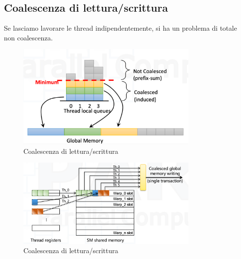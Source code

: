 \subsection{Coalescenza di lettura/scrittura}
Se lasciamo lavorare le thread indipendentemente, si ha un problema
di totale non coalescenza. 
\begin{figure}[H]
  \centering
  \includegraphics[width=0.8\textwidth]{img/coalescenza_bfs.png}
  \caption{Coalescenza di lettura/scrittura}
\end{figure}
\begin{figure}[H]
  \centering
  \includegraphics[width=0.8\textwidth]{img/coalescenza_bfs_2.png}
  \caption{Coalescenza di lettura/scrittura}
\end{figure}
